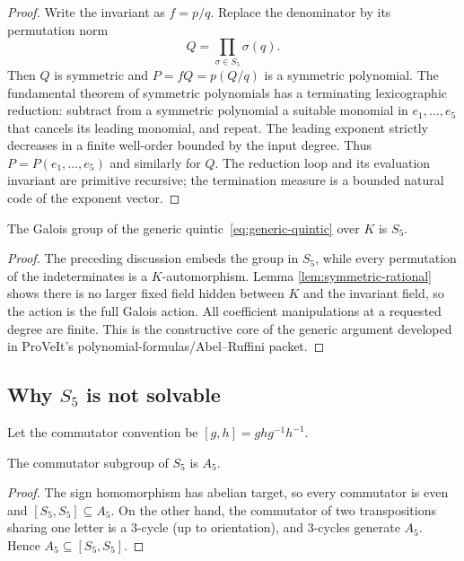 \begin{proof}
Write the invariant as \(f=p/q\).  Replace the denominator by its permutation
norm
\[
 Q=\prod_{\sigma\in S_5}\sigma(q).
\]
Then \(Q\) is symmetric and \(P=fQ=p(Q/q)\) is a symmetric polynomial.
The fundamental theorem of symmetric polynomials has a terminating
lexicographic reduction: subtract from a symmetric polynomial a suitable
monomial in \(e_1,\ldots,e_5\) that cancels its leading monomial, and repeat.
The leading exponent strictly decreases in a finite well-order bounded by the
input degree.  Thus \(P=P(e_1,\ldots,e_5)\) and similarly for \(Q\).  The
reduction loop and its evaluation invariant are primitive recursive; the
termination measure is a bounded natural code of the exponent vector.
\end{proof}

\begin{theorem}\label{thm:generic-S5}
The Galois group of the generic quintic~\eqref{eq:generic-quintic} over
\(K\) is \(S_5\).
\end{theorem}

\begin{proof}
The preceding discussion embeds the group in \(S_5\), while every permutation
of the indeterminates is a \(K\)-automorphism.  Lemma
\ref{lem:symmetric-rational} shows there is no larger fixed field hidden
between \(K\) and the invariant field, so the action is the full Galois action.
All coefficient manipulations at a requested degree are finite.  This is the
constructive core of the generic argument developed in ProVeIt's
polynomial-formulas/Abel--Ruffini packet.
\end{proof}

\subsection{Why \(S_5\) is not solvable}

Let the commutator convention be
\([g,h]=ghg^{-1}h^{-1}\).

\begin{lemma}\label{lem:S5-derived}
The commutator subgroup of \(S_5\) is \(A_5\).
\end{lemma}

\begin{proof}
The sign homomorphism has abelian target, so every commutator is even and
\([S_5,S_5]\subseteq A_5\).  On the other hand, the commutator of two
transpositions sharing one letter is a 3-cycle (up to orientation), and
3-cycles generate \(A_5\).  Hence \(A_5\subseteq[S_5,S_5]\).
\end{proof}


